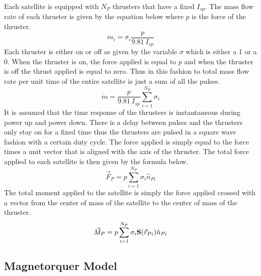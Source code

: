 \documentclass{article}
\begin{document}
Each satellite is equipped with $N_P$ thrusters that have a fixed
$I_{sp}$. The mass flow rate of each thruster is given by the equation
below where $p$ is the force of the thruster.
\begin{equation}
  \dot{m}_i = \sigma_i\frac{p}{9.81~I_{sp}}
\end{equation}
Each thruster is either on or off as given by the variable $\sigma$
which is either a 1 or a 0. When the thruster is on, the force
applied is equal to $p$ and when the thruster is off the thrust
applied is equal to zero. Thus in this fashion to total mass flow rate
per unit time of the entire satellite is just a sum of all the pulses.
\begin{equation}
  \dot{m} = \frac{p}{9.81~I_{sp}}\sum\limits_{i=1}^{N_P}\sigma_i
\end{equation}
It is assumed that the time response of the
thrusters is instantaneous during power up and power down. There is a
delay between pulses and the thrusters only stay on for a fixed time
thus the thrusters are pulsed in a square wave fashion with a certain
duty cycle. The force applied is simply equal to the force times a
unit vector that is aligned with the axis of the thruster. The total
force applied to each satellite is then given by the formula below.
\begin{equation}
  \vec{F}_P = p\sum\limits_{i=1}^{N_P}\sigma_i\hat{n}_{Pi}
\end{equation}
The total moment applied to the satellite is simply the force applied
crossed with a vector from the center of mass of the satellite to the
center of mass of the thruster.
\begin{equation}\label{e:propulsion}
  \vec{M}_P = p\sum\limits_{i=1}^{N_P}\sigma_i{\bf S}(\vec{r}_{Pi})\hat{n}_{Pi}
\end{equation}

\subsection{Magnetorquer Model}
\end{document}
